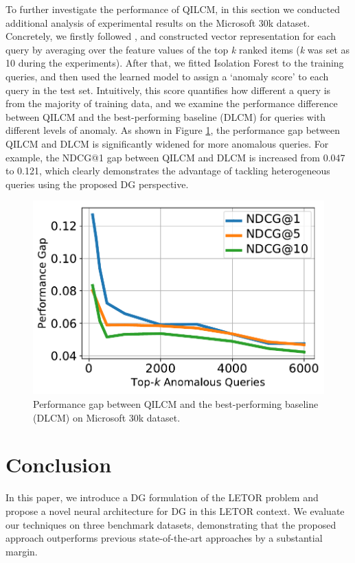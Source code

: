 \documentclass[letterpaper]{article} %
\begin{document}
To further investigate the performance of QILCM, in this section we conducted additional analysis of experimental results on the Microsoft 30k dataset. Concretely, we firstly followed \cite{geng2008query}, and constructed vector representation for each query by averaging over the feature values of the top \textit{k} ranked items (\textit{k} was set as 10 during the experiments). After that, we fitted Isolation Forest \cite{liu2008isolation} to the training queries, and then used the learned model to assign a `anomaly score' to each query in the test set. Intuitively, this score quantifies how different a query is from the majority of training data, and we examine the performance difference between QILCM and the best-performing baseline (DLCM) for queries with different levels of anomaly. As shown in Figure \ref{PerfGap}, the performance gap between QILCM and DLCM is significantly widened for more anomalous queries. For example, the NDCG@1 gap between QILCM and DLCM is increased from 0.047 to 0.121, which clearly demonstrates the advantage of tackling heterogeneous queries using the proposed DG perspective.

\begin{figure}
	\centering
	\includegraphics[width=.7\columnwidth]{foo_3.pdf}
	\caption{Performance gap between QILCM and the best-performing baseline (DLCM) on Microsoft 30k dataset.}
	\label{PerfGap}
\end{figure}


\section{Conclusion}


In this paper, we introduce a DG formulation of the LETOR problem and propose a novel neural architecture for DG in this LETOR context. We evaluate our techniques on three benchmark datasets, demonstrating that the proposed approach outperforms previous state-of-the-art approaches by a substantial margin.
\end{document}
